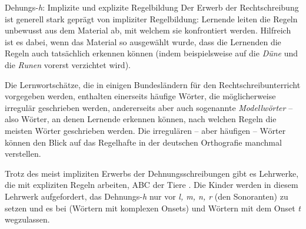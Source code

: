 \begin{Exkurs}{Dehungs-\textit{h}: Implizite und explizite Regelbildung}
Der Erwerb der Rechtschreibung ist generell stark geprägt von impliziter Regelbildung: Lernende leiten die Regeln unbewusst aus dem Material ab, mit welchem sie konfrontiert werden. Hilfreich ist es dabei, wenn das Material so ausgewählt wurde, dass die Lernenden die Regeln auch tatsächlich erkennen können (indem beispielsweise auf die \textit{Düne} und die \textit{Runen} vorerst verzichtet wird).

Die Lernwortschätze, die in einigen Bundesländern für den Rechtschreibunterricht vorgegeben werden, enthalten einerseits häufige Wörter, die möglicherweise irregulär geschrieben werden, andererseits aber auch sogenannte \textit{Modellwörter} -- also Wörter, an denen Lernende erkennen können, nach welchen Regeln die meisten Wörter geschrieben werden. Die irregulären -- aber häufigen -- Wörter können den Blick auf das Regelhafte in der deutschen Orthografie manchmal verstellen. 

Trotz des meist impliziten Erwerbs der Dehnungsschreibungen gibt es Lehrwerke, die mit expliziten Regeln arbeiten, \zB ABC der Tiere \citep{Mildenbergero.J.}. Die Kinder werden in diesem Lehrwerk aufgefordert, das Dehnungs-\textit{h} nur vor \textit{l, m, n, r} (den Sonoranten) zu setzen und es bei  (Wörtern mit komplexen Onsets) und Wörtern mit dem Onset \textit{t} wegzulassen.

\end{Exkurs}


